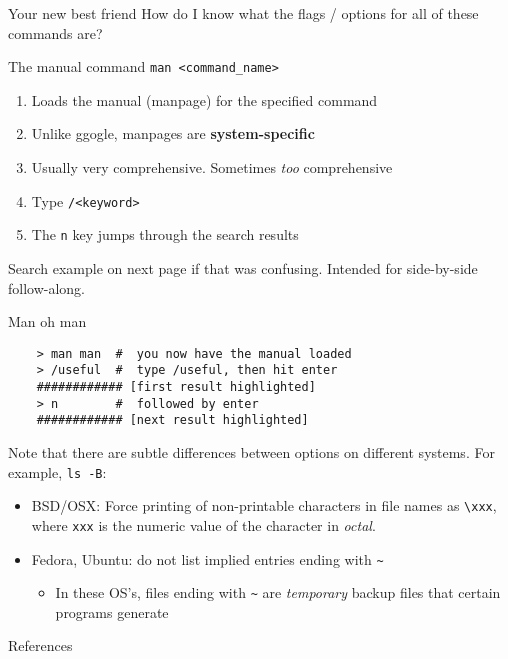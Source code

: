 \documentclass[11pt]{beamer}
\newcommand{\colbf}[1]{\textcolor{mLightBrown!77!black}{#1}}%
\begin{document}
\begin{frame}[fragile]{Your new best friend}
  How do I know what the flags / options for all of these commands are?

  \begin{block}{The \colbf{man}ual command}
    \texttt{man <command\_name>}
    \begin{enumerate}[\--]
      \item Loads the manual (manpage) for the specified command
      \item Unlike ggogle, manpages are \textbf{system-specific}
      \item Usually very comprehensive.  Sometimes \emph{too} comprehensive
      \item Type \texttt{/<keyword>}
      \item The \texttt{n} key jumps through the search results
    \end{enumerate}
  \end{block}
  Search example on next page if that was confusing.  Intended for side-by-side follow-along.
\end{frame}

\begin{frame}[fragile]{Man oh man}
  \begin{verbatim}
    > man man  #  you now have the manual loaded
    > /useful  #  type /useful, then hit enter
    ############ [first result highlighted]
    > n        #  followed by enter
    ############ [next result highlighted]
  \end{verbatim}
  Note that there are subtle differences between options on different systems.  For example, \texttt{ls -B}:
  \begin{itemize}
    \item BSD/OSX: Force printing of non-printable characters in file names as \texttt{\textbackslash xxx},
          where \texttt{xxx} is the numeric value of the character in \emph{octal}.
    \item Fedora, Ubuntu: do not list implied entries ending with \texttt{\textasciitilde}
    \begin{itemize}
      \item In these OS's, files ending with \texttt{\textasciitilde} are \emph{temporary} backup files that
            certain programs generate
    \end{itemize}
  \end{itemize}
\end{frame}

%

\begin{frame}[allowframebreaks]{References}
  
  
\end{frame}
\end{document}
